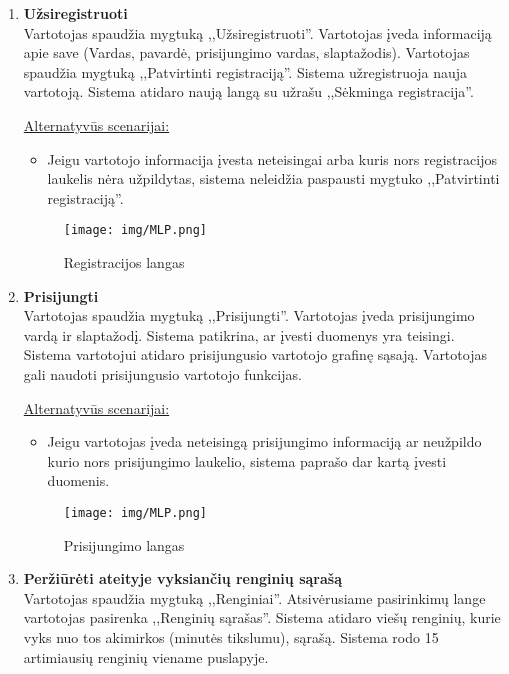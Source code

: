 \documentclass{VUMIFPSkursinis}
\begin{document}
		\begin{enumerate} [label = \textbf{U\arabic*.}]
			\item \textbf{Užsiregistruoti} \\
				Vartotojas spaudžia mygtuką ,,Užsiregistruoti''.
				Vartotojas įveda informaciją apie save (Vardas, pavardė, prisijungimo vardas, slaptažodis).
				Vartotojas spaudžia mygtuką ,,Patvirtinti registraciją''. 
				Sistema užregistruoja nauja vartotoją. Sistema atidaro naują langą su užrašu ,,Sėkminga registracija''.
				
				\underline{Alternatyvūs scenarijai:}
				\begin{itemize}
					\item Jeigu vartotojo informacija įvesta neteisingai arba kuris nors registracijos laukelis nėra užpildytas, 
					sistema neleidžia paspausti mygtuko ,,Patvirtinti registraciją''. 
				\end{itemize}

				\begin{figure}[H]
					\centering
					\texttt{[image: img/MLP.png]}
					\caption{Registracijos langas}
					\label{fig:uzd_registracija}
				\end{figure}
			\item \textbf{Prisijungti} \\
				Vartotojas spaudžia mygtuką ,,Prisijungti''. 
				Vartotojas įveda prisijungimo vardą ir slaptažodį.	
				Sistema patikrina, ar įvesti duomenys yra teisingi. 
				Sistema vartotojui atidaro prisijungusio vartotojo grafinę sąsają. 
				Vartotojas gali naudoti prisijungusio vartotojo funkcijas.
				
				\underline{Alternatyvūs scenarijai:}
				\begin{itemize}
					\item Jeigu vartotojas įveda neteisingą prisijungimo informaciją ar neužpildo kurio nors prisijungimo laukelio, 
					sistema paprašo dar kartą įvesti duomenis.
				\end{itemize}

				\begin{figure}[H]
						\centering
						\texttt{[image: img/MLP.png]}
						\caption{Prisijungimo langas}
						\label{fig:prisijungimo-langas}
					\end{figure}
				\item \textbf{Peržiūrėti ateityje vyksiančių renginių sąrašą} \\
					Vartotojas spaudžia mygtuką ,,Renginiai''. 
					Atsivėrusiame pasirinkimų lange vartotojas pasirenka ,,Renginių sąrašas''.
					Sistema atidaro viešų renginių, kurie vyks nuo tos akimirkos (minutės tikslumu), sąrašą. 
					Sistema rodo 15 artimiausių renginių viename puslapyje.
					

\end{enumerate}
\end{document}
